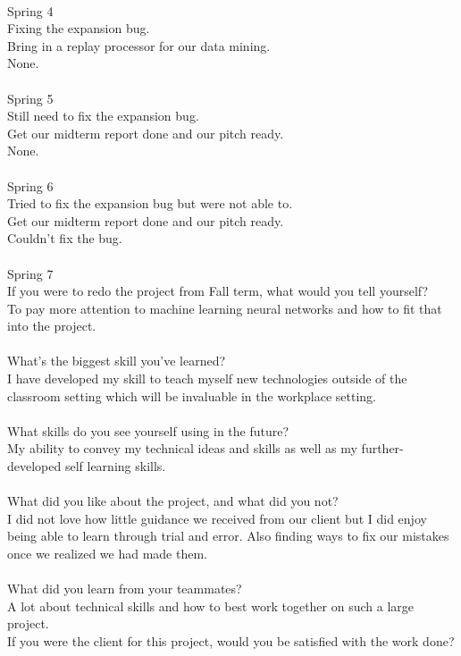 \documentclass[10pt,letterpaper,onecolumn,draftclsnofoot]{IEEEtran}
\begin{document}
\\
Spring 4\\
Fixing the expansion bug.\\ Bring in a replay processor for our data mining.\\ None.\\
\\
Spring 5\\
Still need to fix the expansion bug.\\ Get our midterm report done and our pitch ready.\\ None.\\
\\
Spring 6\\
Tried to fix the expansion bug but were not able to.\\ Get our midterm report done and our pitch ready.\\ Couldn't fix the bug.\\
\\
Spring 7\\
If you were to redo the project from Fall term, what would you tell yourself?\\
To pay more attention to machine learning neural networks and how to fit that into the project.\\
\\
What's the biggest skill you've learned?\\
I have developed my skill to teach myself new technologies outside of the classroom setting which will be invaluable in the workplace setting.\\
\\
What skills do you see yourself using in the future?\\
My ability to convey my technical ideas and skills as well as my further-developed self learning skills.\\
\\
What did you like about the project, and what did you not?\\
I did not love how little guidance we received from our client but I did enjoy being able to learn through trial and error. Also finding ways to fix our mistakes once we realized we had made them.\\
\\
What did you learn from your teammates?\\
A lot about technical skills and how to best work together on such a large project.
\\
If you were the client for this project, would you be satisfied with the work done?\\
\end{document}
